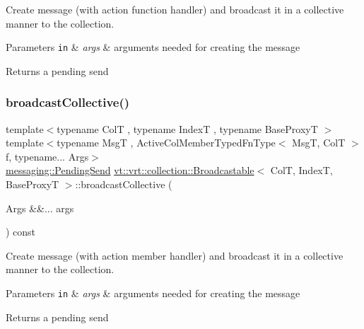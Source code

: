 Create message (with action function handler) and broadcast it in a collective manner to the collection. 


\begin{DoxyParams}[1]{Parameters}
\mbox{\tt in}  & {\em args} & arguments needed for creating the message\\
\hline
\end{DoxyParams}
\begin{DoxyReturn}{Returns}
a pending send 
\end{DoxyReturn}
\mbox{\label{structvt_1_1vrt_1_1collection_1_1_broadcastable_acef03dd57082f32556bef0e536a07fe9}} 
\subsubsection{\texorpdfstring{broadcast\+Collective()}{broadcastCollective()}\hspace{0.1cm}{\footnotesize\ttfamily [2/3]}}
{\footnotesize\ttfamily template$<$typename ColT , typename IndexT , typename Base\+ProxyT $>$ \\
template$<$typename MsgT , Active\+Col\+Member\+Typed\+Fn\+Type$<$ Msg\+T, Col\+T $>$ f, typename... Args$>$ \\
\hyperlink{structvt_1_1messaging_1_1_pending_send}{messaging\+::\+Pending\+Send} \hyperlink{structvt_1_1vrt_1_1collection_1_1_broadcastable}{vt\+::vrt\+::collection\+::\+Broadcastable}$<$ ColT, IndexT, Base\+ProxyT $>$\+::broadcast\+Collective (\begin{DoxyParamCaption}\item[{Args \&\&...}]{args }\end{DoxyParamCaption}) const}



Create message (with action member handler) and broadcast it in a collective manner to the collection. 


\begin{DoxyParams}[1]{Parameters}
\mbox{\tt in}  & {\em args} & arguments needed for creating the message\\
\hline
\end{DoxyParams}
\begin{DoxyReturn}{Returns}
a pending send 
\end{DoxyReturn}
\mbox{\label{structvt_1_1vrt_1_1collection_1_1_broadcastable_ab04bb88a6120f3032a9af4aa173dabb5}} 
